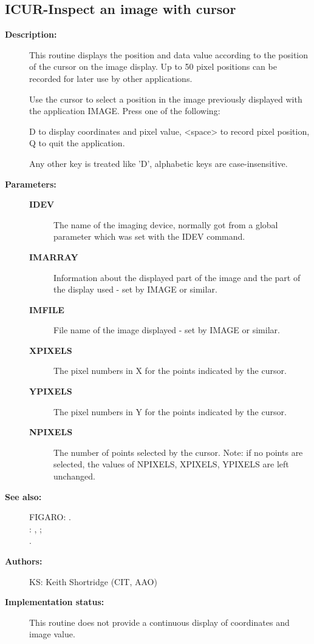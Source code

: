 \subsection{ICUR-\label{ICUR}Inspect an image with cursor}
\begin{description}

\item [{\bf Description:}]
 This routine displays the position and data value according to the
 position of the cursor on the image display. Up to 50 pixel
 positions can be recorded for later use by other applications.

 Use the cursor to select a position in the image previously
 displayed with the application IMAGE. Press one of the following:

      D     to display coordinates and pixel value,
   <space>  to record pixel position,
      Q     to quit the application.

 Any other key is treated like 'D', alphabetic keys are
 case-insensitive.

\item [{\bf Parameters:}]
\begin{description}
\item [{\bf IDEV}]
 The name of the imaging device, normally got from a global
 parameter which was set with the IDEV command.
\item [{\bf IMARRAY}]
 Information about the displayed part of the image and the part
 of the display used - set by IMAGE or similar.
\item [{\bf IMFILE}]
 File name of the image displayed - set by IMAGE or similar.
\item [{\bf XPIXELS}]
 The pixel numbers in X for the points indicated by the cursor.
\item [{\bf YPIXELS}]
 The pixel numbers in Y for the points indicated by the cursor.
\item [{\bf NPIXELS}]
 The number of points selected by the cursor. Note: if no points
 are selected, the values of NPIXELS, XPIXELS, YPIXELS are left
 unchanged.
\end{description}

\item [{\bf See also:}]
FIGARO: .\\
: , ;\\
.\\

\item [{\bf Authors:}]
 KS: Keith Shortridge (CIT, AAO)

\item [{\bf Implementation status:}]
 This routine does not provide a continuous display of coordinates
 and image value.
\end{description}
